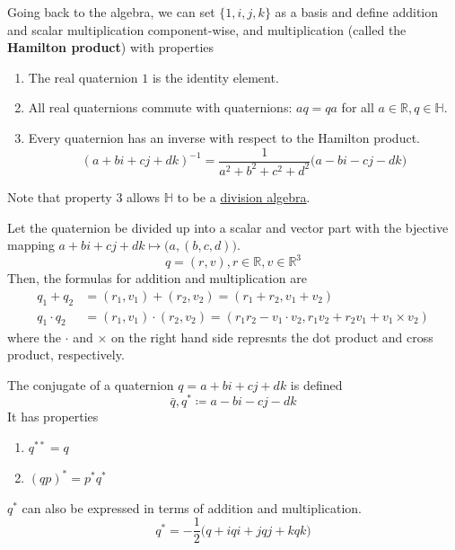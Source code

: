   Going back to the algebra, we can set $\{1, i, j, k\}$ as a basis and define addition and scalar multiplication component-wise, and multiplication (called the \textbf{Hamilton product}) with properties
  \begin{enumerate}
    \item The real quaternion $1$ is the identity element. 
    \item All real quaternions commute with quaternions: $a q = q a$ for all $a \in \mathbb{R}, q \in \mathbb{H}$. 
    \item Every quaternion has an inverse with respect to the Hamilton product. 
      \begin{equation}
        (a + bi + cj + dk)^{-1} = \frac{1}{a^2 + b^2 + c^2 + d^2} \big( a - bi - cj - dk\big)
      \end{equation}
  \end{enumerate}
  Note that property 3 allows $\mathbb{H}$ to be a \hyperref[def:division-algebra]{division algebra}. 

  \begin{theorem}
    \label{thm:scalar-and-vector-components}
    Let the quaternion be divided up into a scalar and vector part with the bjective mapping $a + bi + cj + dk \mapsto \big(a, (b, c, d)\big)$. 
    \begin{equation}
      q = (r, v), r \in \mathbb{R}, v \in \mathbb{R}^3
    \end{equation}
    Then, the formulas for addition and multiplication are
    \begin{align*}
      q_1 + q_2 & = (r_1, v_1) + (r_2, v_2) = (r_1 + r_2, v_1 + v_2) \\
      q_1 \cdot q_2 & = (r_1, v_1) \cdot (r_2, v_2) = (r_1 r_2 - v_1 \cdot v_2, r_1 v_2 + r_2 v_1 + v_1 \times v_2)
    \end{align*}
    where the $\cdot$ and $\times$ on the right hand side represnts the dot product and cross product, respectively. 
  \end{theorem}

  \begin{definition}
    \label{def:quaternion-conjugate}
    The conjugate of a quaternion $q = a + bi + cj + dk$ is defined 
    \begin{equation}
      \bar{q}, q^* \coloneqq a - bi - cj - dk
    \end{equation}
    It has properties
    \begin{enumerate}
      \item $q^{**} = q$
      \item $(q p)^* = p^* q^*$
    \end{enumerate}
    $q^*$ can also be expressed in terms of addition and multiplication. 
    \begin{equation}
      q^* = -\frac{1}{2} \big( q + iqi + jqj + kqk \big)
    \end{equation}
  \end{definition}

